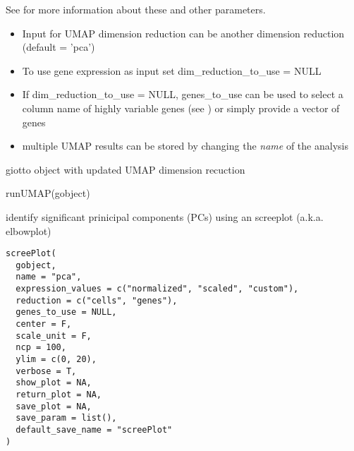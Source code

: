 \documentclass[a4paper]{book}
\begin{document}
%
\begin{Details}\relax
See  for more information about these and other parameters.
\begin{itemize}

\item{} Input for UMAP dimension reduction can be another dimension reduction (default = 'pca')
\item{} To use gene expression as input set dim\_reduction\_to\_use = NULL
\item{} If dim\_reduction\_to\_use = NULL, genes\_to\_use can be used to select a column name of
highly variable genes (see ) or simply provide a vector of genes
\item{} multiple UMAP results can be stored by changing the \emph{name} of the analysis

\end{itemize}

\end{Details}
%
\begin{Value}
giotto object with updated UMAP dimension recuction
\end{Value}
%
\begin{Examples}
\begin{ExampleCode}
    runUMAP(gobject)
\end{ExampleCode}
\end{Examples}
%
\begin{Description}\relax
identify significant prinicipal components (PCs) using an screeplot (a.k.a. elbowplot)
\end{Description}
%
\begin{Usage}
\begin{verbatim}
screePlot(
  gobject,
  name = "pca",
  expression_values = c("normalized", "scaled", "custom"),
  reduction = c("cells", "genes"),
  genes_to_use = NULL,
  center = F,
  scale_unit = F,
  ncp = 100,
  ylim = c(0, 20),
  verbose = T,
  show_plot = NA,
  return_plot = NA,
  save_plot = NA,
  save_param = list(),
  default_save_name = "screePlot"
)
\end{verbatim}
\end{Usage}
%
\end{document}
